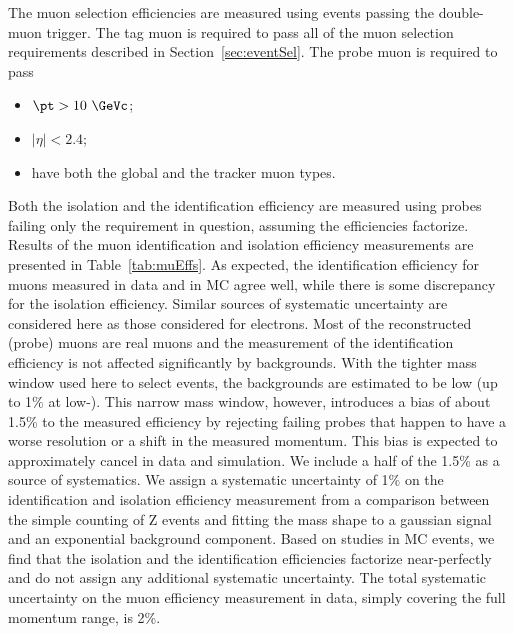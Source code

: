The muon selection efficiencies are measured using events passing the double-muon trigger.
The tag muon is required to pass all of the muon selection requirements described in Section~\ref{sec:eventSel}.
The probe muon is required to pass
\begin{itemize}
\item $\pt>10~\GeVc$;
\item $|\eta|<2.4$;
\item have both the global and the tracker muon types.
\end{itemize}
Both the  isolation and the identification efficiency are measured using probes failing only the requirement in question,
assuming the efficiencies factorize.
Results of the muon identification and isolation efficiency measurements are presented in Table~\ref{tab:muEffs}.
As expected, the identification efficiency for muons measured in data and in MC agree well,
while there is some discrepancy for the isolation efficiency.
Similar sources of systematic uncertainty are considered here as those considered for electrons.
Most of the reconstructed (probe) muons are real muons and the measurement of the identification efficiency
is not affected significantly by backgrounds.
With the tighter mass window used here to select events,
 the backgrounds are estimated to be low (up to 1\% at low-\pt).
This narrow mass window, however, introduces a bias of about 1.5\% 
to the measured efficiency
by rejecting failing probes that happen to have a worse resolution or a shift
in the measured momentum.
This bias is expected to approximately cancel in data and simulation.
We include a half of the 1.5\% as a source of systematics.
We assign a systematic uncertainty of 1\% on the identification and isolation efficiency measurement  
from a comparison between the simple counting of Z events and fitting the mass shape to a gaussian signal and an 
exponential background component.
Based on studies in MC events, we find that the isolation and the identification efficiencies
 factorize near-perfectly and do not assign any additional systematic uncertainty.
The total systematic uncertainty on the muon efficiency measurement in 
data, simply covering the full momentum range, is 2\%.


